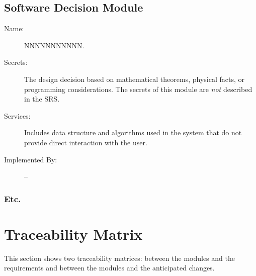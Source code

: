 \documentclass[12pt, titlepage]{article}
\newcommand{\newSection}[1]{
  \newpage
  \section{#1}
}
\begin{document}
	\subsection{Software Decision Module}

		\bigskip\begin{description}
			\item[Name:]NNNNNNNNNNN.
			\item[Secrets:] The design decision based on mathematical theorems, physical facts, or programming considerations. The secrets of this module are \emph{not} described in the SRS.
			\item[Services:] Includes data structure and algorithms used in the system that do not provide direct interaction with the user. 
			\item[Implemented By:] --
		\end{description}

	  \subsubsection{Etc.}

\newSection{Traceability Matrix} \label{SecTM}

	This section shows two traceability matrices: between the modules and the
	requirements and between the modules and the anticipated changes.
\end{document}
